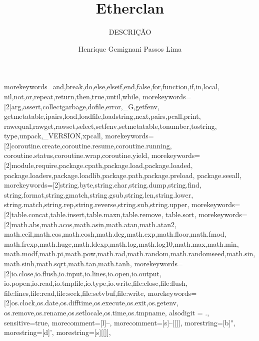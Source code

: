 \documentclass[brazil]{beamer}
\title{
  Etherclan
}
\subtitle{
  DESCRIÇÃO
}
\author{Henrique Gemignani Passos Lima}
\begin{document}
  {morekeywords={and,break,do,else,elseif,end,false,for,function,if,in,local,
     nil,not,or,repeat,return,then,true,until,while},
   morekeywords={[2]arg,assert,collectgarbage,dofile,error,_G,getfenv,
     getmetatable,ipairs,load,loadfile,loadstring,next,pairs,pcall,print,
     rawequal,rawget,rawset,select,setfenv,setmetatable,tonumber,tostring,
     type,unpack,_VERSION,xpcall},
   morekeywords={[2]coroutine.create,coroutine.resume,coroutine.running,
     coroutine.status,coroutine.wrap,coroutine.yield},
   morekeywords={[2]module,require,package.cpath,package.load,package.loaded,
     package.loaders,package.loadlib,package.path,package.preload,
     package.seeall},
   morekeywords={[2]string.byte,string.char,string.dump,string.find,
     string.format,string.gmatch,string.gsub,string.len,string.lower,
     string.match,string.rep,string.reverse,string.sub,string.upper},
   morekeywords={[2]table.concat,table.insert,table.maxn,table.remove,
   table.sort},
   morekeywords={[2]math.abs,math.acos,math.asin,math.atan,math.atan2,
     math.ceil,math.cos,math.cosh,math.deg,math.exp,math.floor,math.fmod,
     math.frexp,math.huge,math.ldexp,math.log,math.log10,math.max,math.min,
     math.modf,math.pi,math.pow,math.rad,math.random,math.randomseed,math.sin,
     math.sinh,math.sqrt,math.tan,math.tanh},
   morekeywords={[2]io.close,io.flush,io.input,io.lines,io.open,io.output,
     io.popen,io.read,io.tmpfile,io.type,io.write,file:close,file:flush,
     file:lines,file:read,file:seek,file:setvbuf,file:write},
   morekeywords={[2]os.clock,os.date,os.difftime,os.execute,os.exit,os.getenv,
     os.remove,os.rename,os.setlocale,os.time,os.tmpname},
   alsodigit = {.},
   sensitive=true,
   morecomment=[l]{--},
   morecomment=[s]{--[[}{]]},
   morestring=[b]",
   morestring=[d]',
   morestring=[s]{[[}{]]},
  }


\frame{\tableofcontents}

\end{document}

